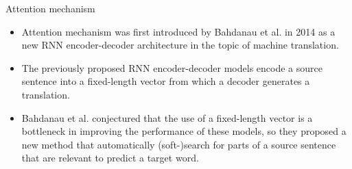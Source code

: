 \documentclass[10pt]{beamer}
\begin{document}
\begin{frame}{Attention mechanism}
\begin{itemize}
\item
Attention mechanism was first introduced by Bahdanau et al. in 2014 \cite{bahdanau2014neural} as a new RNN encoder-decoder architecture in the topic of machine translation.
\item
The previously proposed RNN encoder-decoder models encode a source sentence into a fixed-length vector from which a decoder generates a translation.
\item
Bahdanau et al. conjectured that the use of a fixed-length vector is a bottleneck in improving the performance of these models, so they proposed a new method that automatically (soft-)search for parts of a source sentence that are relevant to predict a target word.
\end{itemize}
\end{frame}
\end{document}
